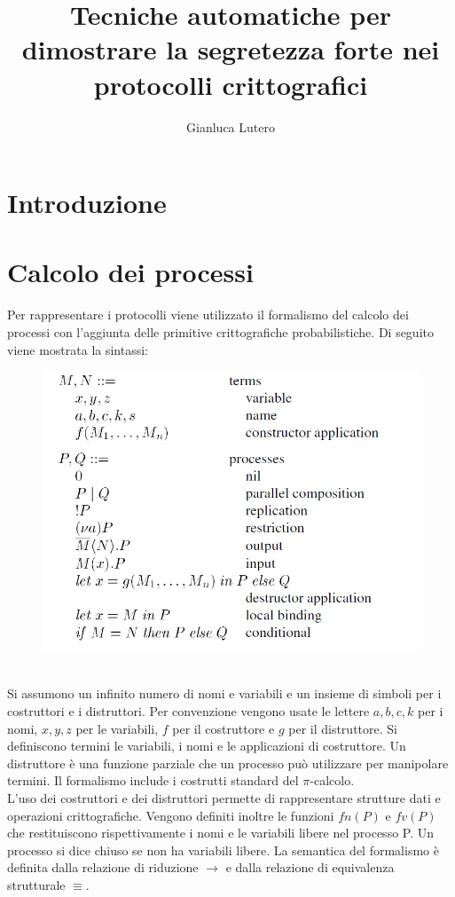 \documentclass[12pt]{report}
\title{Tecniche automatiche per dimostrare la segretezza forte nei protocolli crittografici}
\author{Gianluca Lutero}
\begin{document}
\maketitle
\newpage

\newpage
{}
\section*{Introduzione}
\section*{Calcolo dei processi}
Per rappresentare i protocolli viene utilizzato il formalismo del calcolo dei processi con l'aggiunta delle primitive crittografiche probabilistiche. Di seguito viene mostrata la sintassi:\\
\begin{figure}[h]
    \centering
    \includegraphics[scale=0.6]{Relazione/Immagini/calcolo.PNG}
\end{figure}\\
Si assumono un infinito numero di nomi e variabili e un insieme di simboli per i costruttori e i distruttori. Per convenzione vengono usate le lettere $a, b, c, k$ per i nomi, $x, y, z$ per le variabili, $f$ per il costruttore e $g$ per il distruttore. Si definiscono termini le variabili, i nomi e le applicazioni di costruttore. Un distruttore è una funzione parziale che un processo può utilizzare per manipolare termini. Il formalismo include i costrutti standard del $\pi$-calcolo.\\
L'uso dei costruttori e dei distruttori permette di rappresentare strutture dati e operazioni crittografiche. Vengono definiti inoltre le funzioni $fn(P)$ e $fv(P)$ che restituiscono rispettivamente i nomi e le variabili libere nel processo P. Un processo si dice chiuso se non ha variabili libere. La semantica del formalismo è definita dalla relazione di riduzione $ \xrightarrow{} $ e dalla relazione di equivalenza strutturale $ \equiv$.
\end{document}
